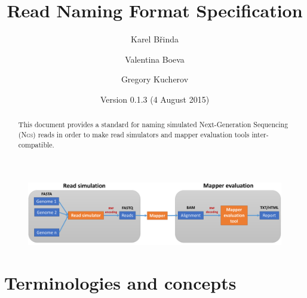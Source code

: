 \documentclass[10pt,a4paper]{article}
\title{Read Naming Format Specification}
\date{Version 0.1.3 (4 August 2015)}
\author{Karel Břinda \and Valentina Boeva \and Gregory Kucherov}
\newcommand{\RNF}{\textsc{Rnf}}
\newcommand{\NGS}{\textsc{Ngs}}
\begin{document}
\maketitle


\begin{abstract}
	This document provides a standard for
	naming simulated Next-Generation Sequencing (\NGS) reads
	in order to make read simulators and mapper evaluation tools inter-compatible.
\end{abstract}


\bigskip

\begin{figure}[h]
\includegraphics[width=\textwidth]{evaluation_rnf_cropped.pdf}
\end{figure}



\section{Terminologies and concepts}
\end{document}
